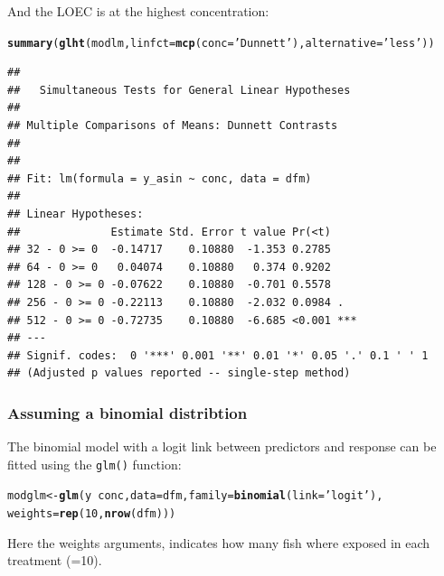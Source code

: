 \documentclass{scrartcl}\usepackage[]{graphicx}\usepackage[]{color}
\makeatletter
\newcommand{\hlnum}[1]{\textcolor[rgb]{0.686,0.059,0.569}{#1}}%
\newcommand{\hlstr}[1]{\textcolor[rgb]{0.192,0.494,0.8}{#1}}%
\newcommand{\hlopt}[1]{\textcolor[rgb]{0,0,0}{#1}}%
\newcommand{\hlstd}[1]{\textcolor[rgb]{0.345,0.345,0.345}{#1}}%
\newcommand{\hlkwb}[1]{\textcolor[rgb]{0.69,0.353,0.396}{#1}}%
\newcommand{\hlkwc}[1]{\textcolor[rgb]{0.333,0.667,0.333}{#1}}%
\newcommand{\hlkwd}[1]{\textcolor[rgb]{0.737,0.353,0.396}{\textbf{#1}}}%
\newenvironment{kframe}{%
 \def\at@end@of@kframe{}%
 \ifinner\ifhmode%
  \def\at@end@of@kframe{\end{minipage}}%
  \begin{minipage}{\columnwidth}%
 \fi\fi%
 \def\FrameCommand##1{\hskip\@totalleftmargin \hskip-\fboxsep
 \colorbox{shadecolor}{##1}\hskip-\fboxsep
     \hskip-\linewidth \hskip-\@totalleftmargin \hskip\columnwidth}%
 \MakeFramed {\advance\hsize-\width
   \@totalleftmargin\z@ \linewidth\hsize
   \@setminipage}}%
 {\par\unskip\endMakeFramed%
 \at@end@of@kframe}
\newenvironment{knitrout}{}{} %
\makeatother
\begin{document}
And the LOEC is at the highest concentration:
\begin{knitrout}
\color{fgcolor}\begin{kframe}
\begin{alltt}
\hlkwd{summary}\hlstd{(}\hlkwd{glht}\hlstd{(modlm,} \hlkwc{linfct} \hlstd{=} \hlkwd{mcp}\hlstd{(}\hlkwc{conc} \hlstd{=} \hlstr{'Dunnett'}\hlstd{),} \hlkwc{alternative} \hlstd{=} \hlstr{'less'}\hlstd{))}
\end{alltt}
\begin{verbatim}
## 
## 	 Simultaneous Tests for General Linear Hypotheses
## 
## Multiple Comparisons of Means: Dunnett Contrasts
## 
## 
## Fit: lm(formula = y_asin ~ conc, data = dfm)
## 
## Linear Hypotheses:
##              Estimate Std. Error t value Pr(<t)    
## 32 - 0 >= 0  -0.14717    0.10880  -1.353 0.2785    
## 64 - 0 >= 0   0.04074    0.10880   0.374 0.9202    
## 128 - 0 >= 0 -0.07622    0.10880  -0.701 0.5578    
## 256 - 0 >= 0 -0.22113    0.10880  -2.032 0.0984 .  
## 512 - 0 >= 0 -0.72735    0.10880  -6.685 <0.001 ***
## ---
## Signif. codes:  0 '***' 0.001 '**' 0.01 '*' 0.05 '.' 0.1 ' ' 1
## (Adjusted p values reported -- single-step method)
\end{verbatim}
\end{kframe}
\end{knitrout}


\subsubsection{Assuming a binomial distribtion}
The binomial model with a logit link between predictors and response can be fitted using the \texttt{glm()} function:
\begin{knitrout}
\color{fgcolor}\begin{kframe}
\begin{alltt}
\hlstd{modglm} \hlkwb{<-} \hlkwd{glm}\hlstd{(y} \hlopt{~} \hlstd{conc ,} \hlkwc{data} \hlstd{= dfm,} \hlkwc{family} \hlstd{=} \hlkwd{binomial}\hlstd{(}\hlkwc{link} \hlstd{=} \hlstr{'logit'}\hlstd{),}
              \hlkwc{weights} \hlstd{=} \hlkwd{rep}\hlstd{(}\hlnum{10}\hlstd{,} \hlkwd{nrow}\hlstd{(dfm)))}
\end{alltt}
\end{kframe}
\end{knitrout}

Here the weights arguments, indicates how many fish where exposed in each treatment (=10).
\end{document}
